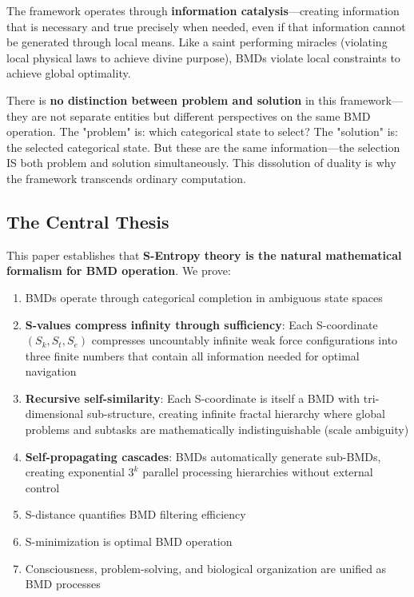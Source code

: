 \documentclass[12pt,a4paper]{article}
\begin{document}
The framework operates through \textbf{information catalysis}—creating information that is necessary and true precisely when needed, even if that information cannot be generated through local means. Like a saint performing miracles (violating local physical laws to achieve divine purpose), BMDs violate local constraints to achieve global optimality.

There is \textbf{no distinction between problem and solution} in this framework—they are not separate entities but different perspectives on the same BMD operation. The "problem" is: which categorical state to select? The "solution" is: the selected categorical state. But these are the same information—the selection IS both problem and solution simultaneously. This dissolution of duality is why the framework transcends ordinary computation.

\subsection{The Central Thesis}

This paper establishes that \textbf{S-Entropy theory is the natural mathematical formalism for BMD operation}. We prove:

\begin{enumerate}
\item BMDs operate through categorical completion in ambiguous state spaces
\item \textbf{S-values compress infinity through sufficiency}: Each S-coordinate $(S_k, S_t, S_e)$ compresses uncountably infinite weak force configurations into three finite numbers that contain all information needed for optimal navigation
\item \textbf{Recursive self-similarity}: Each S-coordinate is itself a BMD with tri-dimensional sub-structure, creating infinite fractal hierarchy where global problems and subtasks are mathematically indistinguishable (scale ambiguity)
\item \textbf{Self-propagating cascades}: BMDs automatically generate sub-BMDs, creating exponential $3^k$ parallel processing hierarchies without external control
\item S-distance quantifies BMD filtering efficiency
\item S-minimization is optimal BMD operation
\item Consciousness, problem-solving, and biological organization are unified as BMD processes
\end{enumerate}
\end{document}
